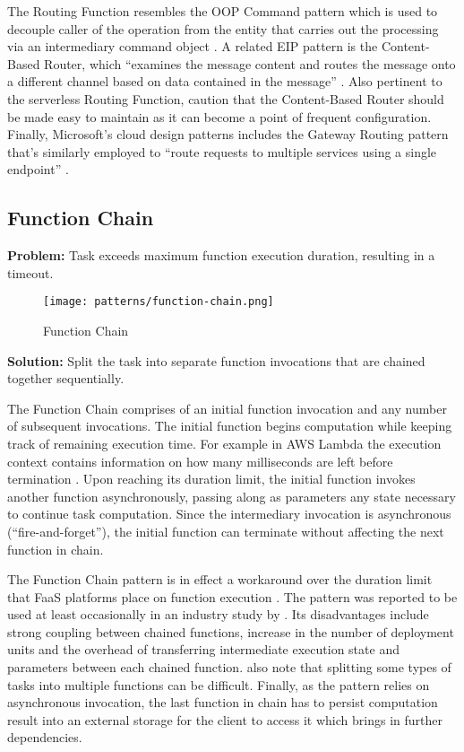 The Routing Function resembles the OOP Command pattern which is used to decouple caller of the operation from the entity that carries out the processing via an intermediary command object \parencite{gamma94designPatterns}. A related EIP pattern is the Content-Based Router, which ``examines the message content and routes the message onto a different channel based on data contained in the message'' \parencite{hohpe2004enterprise}. Also pertinent to the serverless Routing Function, \textcite{hohpe2004enterprise} caution that the Content-Based Router should be made easy to maintain as it can become a point of frequent configuration. Finally, Microsoft's cloud design patterns includes the Gateway Routing pattern that's similarly employed to ``route requests to multiple services using a single endpoint'' \parencite{microsoft18cloudPatterns}.

\subsection{Function Chain} \label{subsec:functionChain}

\textbf{Problem:} Task exceeds maximum function execution duration, resulting in a timeout.

\begin{figure}[h]
  \centering
  \texttt{[image: patterns/function-chain.png]}
  \caption{Function Chain}
  \label{fig:patternFunctionChain}
\end{figure}

\textbf{Solution:} Split the task into separate function invocations that are chained together sequentially.

The Function Chain comprises of an initial function invocation and any number of subsequent invocations. The initial function begins computation while keeping track of remaining execution time. For example in AWS Lambda the execution context contains information on how many milliseconds are left before termination \parencite{awslambda0218}. Upon reaching its duration limit, the initial function invokes another function asynchronously, passing along as parameters any state necessary to continue task computation. Since the intermediary invocation is asynchronous (``fire-and-forget''), the initial function can terminate without affecting the next function in chain.

The Function Chain pattern is in effect a workaround over the duration limit that FaaS platforms place on function execution \parencite{leitner18industrialpractice}. The pattern was reported to be used at least occasionally in an industry study by \textcite{leitner18industrialpractice}. Its disadvantages include strong coupling between chained functions, increase in the number of deployment units and the overhead of transferring intermediate execution state and parameters between each chained function. \textcite{leitner18industrialpractice} also note that splitting some types of tasks into multiple functions can be difficult. Finally, as the pattern relies on asynchronous invocation, the last function in chain has to persist computation result into an external storage for the client to access it which brings in further dependencies.

